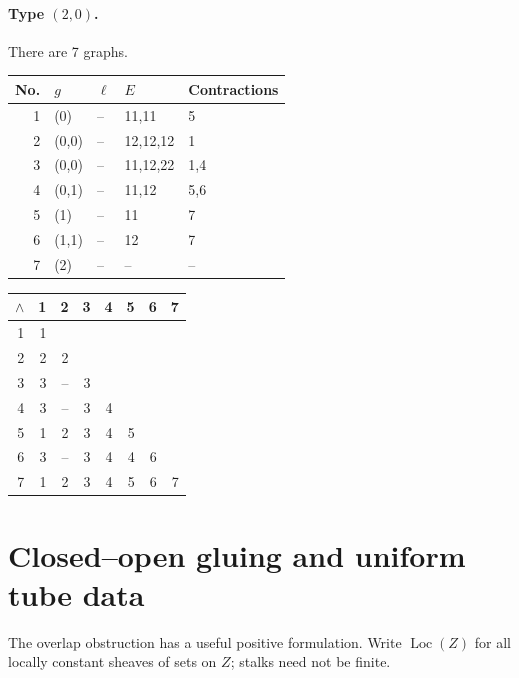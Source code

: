 \documentclass[11pt,a4paper]{article}
\theoremstyle{definition}
\begin{document}
\begin{samepage}
\paragraph{Type $(2,0)$.} There are 7 graphs.
\begin{center}\small
\begin{tabular}{rllll}\toprule
No.&$g$&$\ell$&$E$&Contractions\\\midrule
1 & (0) & -- & 11,11 & 5\\
2 & (0,0) & -- & 12,12,12 & 1\\
3 & (0,0) & -- & 11,12,22 & 1,4\\
4 & (0,1) & -- & 11,12 & 5,6\\
5 & (1) & -- & 11 & 7\\
6 & (1,1) & -- & 12 & 7\\
7 & (2) & -- & -- & --\\
\bottomrule\end{tabular}\end{center}
\end{samepage}
\begin{center}\scriptsize\setlength{\tabcolsep}{2pt}
\begin{tabular}{r|rrrrrrr}
$\wedge$&1&2&3&4&5&6&7\\\hline
1&1&&&&&&\\
2&2&2&&&&&\\
3&3&--&3&&&&\\
4&3&--&3&4&&&\\
5&1&2&3&4&5&&\\
6&3&--&3&4&4&6&\\
7&1&2&3&4&5&6&7\\
\end{tabular}\end{center}

\section{Closed--open gluing and uniform tube data}\label{sec:recollement}
The overlap obstruction has a useful positive formulation. Write
$\operatorname{Loc}(Z)$ for all locally constant sheaves of sets on
$Z$; stalks need not be finite.
\end{document}
